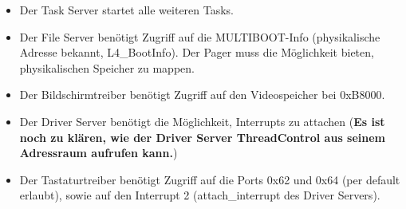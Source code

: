 \begin{itemize}
	\item Der Task Server startet alle weiteren Tasks.
	
	\item Der File Server benötigt Zugriff auf die MULTIBOOT-Info (physikalische Adresse bekannt, L4\_BootInfo). Der Pager muss die Möglichkeit bieten, physikalischen Speicher zu mappen.
	
	\item Der Bildschirmtreiber benötigt Zugriff auf den Videospeicher bei 0xB8000.
	
	\item Der Driver Server benötigt die Möglichkeit, Interrupts zu attachen (\textbf{Es ist noch zu klären, wie der Driver Server ThreadControl aus seinem Adressraum aufrufen kann.})
	
	\item Der Tastaturtreiber benötigt Zugriff auf die Ports 0x62 und 0x64 (per default erlaubt), sowie auf den Interrupt 2 (attach\_interrupt des Driver Servers).
	
\end{itemize}